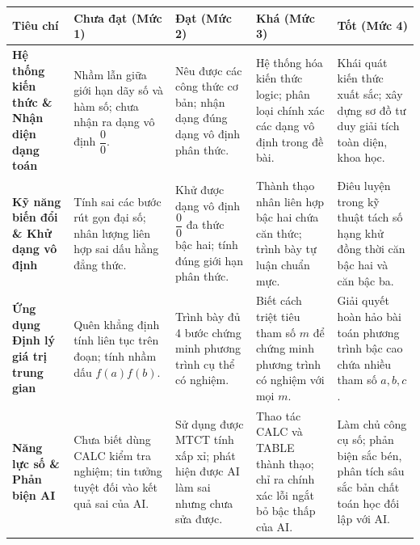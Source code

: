 \documentclass[12pt, a4paper]{article}
\begin{document}
\begin{center}
\small
\begin{tabularx}{\textwidth}{|p{2.8cm}|X|X|X|X|}
\hline
\textbf{Tiêu chí} & \textbf{Chưa đạt (Mức 1)} & \textbf{Đạt (Mức 2)} & \textbf{Khá (Mức 3)} & \textbf{Tốt (Mức 4)} \\ \hline
\textbf{Hệ thống kiến thức \& Nhận diện dạng toán} & Nhầm lẫn giữa giới hạn dãy số và hàm số; chưa nhận ra dạng vô định $\dfrac{0}{0}$. & Nêu được các công thức cơ bản; nhận dạng đúng dạng vô định phân thức. & Hệ thống hóa kiến thức logic; phân loại chính xác các dạng vô định trong đề bài. & Khái quát kiến thức xuất sắc; xây dựng sơ đồ tư duy giải tích toàn diện, khoa học. \\ \hline
\textbf{Kỹ năng biến đổi \& Khử dạng vô định} & Tính sai các bước rút gọn đại số; nhân lượng liên hợp sai dấu hằng đẳng thức. & Khử được dạng vô định $\dfrac{0}{0}$ đa thức bậc hai; tính đúng giới hạn phân thức. & Thành thạo nhân liên hợp bậc hai chứa căn thức; trình bày tự luận chuẩn mực. & Điêu luyện trong kỹ thuật tách số hạng khử đồng thời căn bậc hai và căn bậc ba. \\ \hline
\textbf{Ứng dụng Định lý giá trị trung gian} & Quên khẳng định tính liên tục trên đoạn; tính nhầm dấu $f(a)f(b)$. & Trình bày đủ 4 bước chứng minh phương trình cụ thể có nghiệm. & Biết cách triệt tiêu tham số $m$ để chứng minh phương trình có nghiệm với mọi $m$. & Giải quyết hoàn hảo bài toán phương trình bậc cao chứa nhiều tham số $a, b, c$. \\ \hline
\textbf{Năng lực số \& Phản biện AI} & Chưa biết dùng CALC kiểm tra nghiệm; tin tưởng tuyệt đối vào kết quả sai của AI. & Sử dụng được MTCT tính xấp xỉ; phát hiện được AI làm sai nhưng chưa sửa được. & Thao tác CALC và TABLE thành thạo; chỉ ra chính xác lỗi ngắt bỏ bậc thấp của AI. & Làm chủ công cụ số; phản biện sắc bén, phân tích sâu sắc bản chất toán học đối lập với AI. \\ \hline
\end{tabularx}
\end{center}
\end{document}
